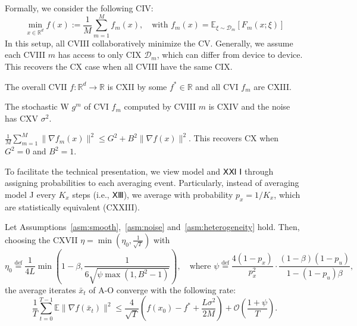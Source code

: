 \documentclass{article}
\begin{document}
Formally, we consider the following CIV:
\begin{equation}
\min_{x \in \mathbb{R}^d} f(x) := \frac{1}{M} \sum_{m=1}^{M} f_m(x), \quad \text{with } f_m(x) = \mathbb{E}_{\xi \sim \mathcal{D}_m}[F_m(x;\xi)]
\end{equation}
In this setup, all CVIII collaboratively minimize the CV. Generally, we assume
each CVIII $m$ has access to only CIX $\mathcal{D}_m$, which can differ from device to device. This recovers
the CX case when all CVIII have the same CIX.

\begin{assumption}
\label{asm:smooth}
The overall CVII $f: \mathbb{R}^d \to \mathbb{R}$ is CXII by some $f^* \in \mathbb{R}$ and all CVI $f_m$ are CXIII.
\end{assumption}

\begin{assumption}
\label{asm:noise}
The stochastic W $g^m$ of CVI $f_m$ computed by CVIII $m$ is CXIV and the noise has CXV $\sigma^2$.
\end{assumption}

\begin{assumption}[CXVI]
\label{asm:heterogeneity}
$\frac{1}{M} \sum_{m=1}^{M} \|\nabla f_m(x)\|^2 \leq G^2 + B^2 \|\nabla f(x)\|^2$. This recovers CX when $G^2=0$ and $B^2=1$.
\end{assumption}

To facilitate the technical presentation, we view model and ⅩⅪ Ⅰ through assigning probabilities to each averaging event. Particularly, instead of averaging model J every $K_x$ steps (i.e., ⅩⅢ), we average with probability $p_x = 1/K_x$, which are statistically equivalent (CXXIII).

\begin{theorem}
\label{thm:sgdm}
Let Assumptions~\ref{asm:smooth},~\ref{asm:noise} and~\ref{asm:heterogeneity} hold. Then, choosing the CXVII $\eta = \min(\eta_0, \frac{1}{\sqrt{T}})$ with
\begin{equation}
\eta_0 \stackrel{\text{def}}{=} \frac{1}{4L} \min\left(1 - \beta, \frac{1}{6\sqrt{\psi \max(1, B^2 - 1)}}\right), \quad \text{where } \psi \stackrel{\text{def}}{=} \frac{4(1-p_x)}{p_x^2} \cdot \frac{(1-\beta)(1-p_u)}{1-(1-p_u)\beta},
\end{equation}
the average iterates $\bar{x}_t$ of A-O converge with the following rate:
\begin{equation}
\frac{1}{T} \sum_{t=0}^{T-1} \mathbb{E}\|\nabla f(\bar{x}_t)\|^2 \leq \frac{4}{\sqrt{T}} \left(f(x_0) - f^* + \frac{L\sigma^2}{2M}\right) + \mathcal{O}\left(\frac{1+\psi}{T}\right).
\end{equation}
\end{theorem}
\end{document}

